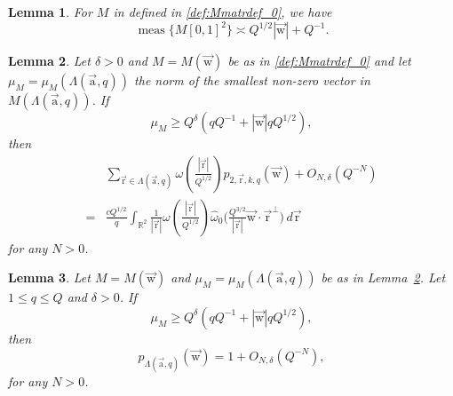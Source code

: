 \documentclass[10pt,a4paper]{amsart}
\newtheorem{lemma}{Lemma}
\newcommand{\R}{\mathbb{R}}
\renewcommand{\hat}{\widehat}
\DeclareMathOperator{\meas}{meas}
\newcommand{\ua}{\vec{\mathrm{a}}}
\newcommand{\ur}{\vec{\mathrm{r}}}
\newcommand{\uw}{{\vec{\mathrm{w}}}}
\begin{document}
\begin{lemma}
	\label{lem:matrix_M}
	 For $M$ in defined in \eqref{def:Mmatrdef_0}, we have 
	\begin{equation*}
		\meas \big\{ M [0,1]^2 \big\} \asymp  Q^{1/2}|\uw|+Q^{-1}.
	\end{equation*}
\end{lemma} 

\begin{lemma}\label{lem:p1_sum_asymptotic}
	Let $\delta>0$ and $M=M(\uw)$ be as in \eqref{def:Mmatrdef_0} and let $\mu_{M}=\mu_M(\Lambda(\ua, q))$ the norm of the smallest non-zero vector in $M (\Lambda (\ua, q))$. If
	\begin{equation}\label{eq:muM assump}
	\mu_M\geq
	Q^{\delta}(qQ^{-1}+|\uw|qQ^{1/2}),
	\end{equation}
	then
	\begin{equation*}%
    \begin{split}
	&\sum_{{\ur\in\Lambda(\ua,q)}}
	\omega\left(
	\frac{ |\ur| }{ Q^{1/2}}
	\right)
	p_{2,\ur,k,q}(\uw)+O_{N,\delta}(Q^{-N})
	\\=&
	\frac{cQ^{1/2}}{q}
	\int_{\R^2}\frac{1}{|\ur|}
	\omega\left(
	\frac{ |\ur| }{ Q^{1/2}}
	\right)
	\hat{\omega}_0
	\Big(
	\frac{Q^{3/2}}{|\ur|} \uw\cdot\ur^\perp
	\Big)\,d\ur
    \end{split}
	\end{equation*}
	for any $N>0$.
\end{lemma}

\begin{lemma}\label{lem:1}
Let $M=M(\uw)$ and $\mu_{M}=\mu_M (\Lambda(\ua, q))$ be as in Lemma~\ref{lem:p1_sum_asymptotic}. Let $1\leq q\leq Q$ and  $\delta>0$. If
	\[
	\mu_M\geq
	Q^{\delta}(qQ^{-1}+|\uw|qQ^{1/2}),
	\]
	then
	\[
	p_{\Lambda(\ua,q)}(\uw)
	=1+O_{N,\delta}(Q^{-N}),
	\]
	for any $N>0$.
\end{lemma}
\end{document}
